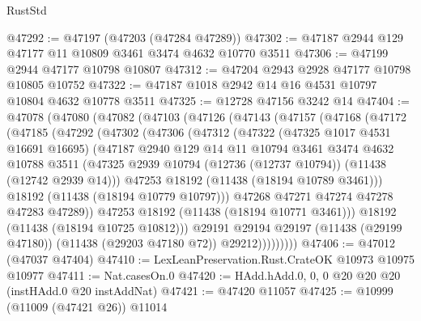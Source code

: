 \begin{lexlean}{RustStd}
\begin{coremodule}
@47292 := @47197 (@47203 (@47284 @47289))
@47302 := @47187 @2944 @129 @47177 @11 @10809 @3461 @3474 @4632 @10770 @3511
@47306 := @47199 @2944 @47177 @10798 @10807
@47312 := @47204 @2943 @2928 @47177 @10798 @10805 @10752
@47322 := @47187 @1018 @2942 @14 @16 @4531 @10797 @10804 @4632 @10778 @3511
@47325 := @12728 @47156 @3242 @14
@47404 := @47078
    (@47080
      (@47082
        (@47103
          (@47126
            (@47143
              (@47157
                (@47168
                  (@47172
                    (@47185
                      (@47292
                        (@47302
                          (@47306
                            (@47312
                              (@47322
                                (@47325 @1017 @4531 @16691 @16695)
                                (@47187
                                  @2940
                                  @129
                                  @14
                                  @11
                                  @10794
                                  @3461
                                  @3474
                                  @4632
                                  @10788
                                  @3511
                                  (@47325
                                    @2939
                                    @10794
                                    (@12736 (@12737 @10794))
                                    (@11438 (@12742 @2939 @14)))
                                  @47253
                                  @18192
                                  (@11438 (@18194 @10789 @3461)))
                                @18192
                                (@11438 (@18194 @10779 @10797)))
                              @47268
                              @47271
                              @47274
                              @47278
                              @47283
                              @47289))
                          @47253
                          @18192
                          (@11438 (@18194 @10771 @3461)))
                        @18192
                        (@11438 (@18194 @10725 @10812)))
                      @29191
                      @29194
                      @29197
                      (@11438 (@29199 @47180))
                      (@11438 (@29203 @47180 @72))
                      @29212)))))))))
@47406 := @47012 (@47037 @47404)
@47410 := LexLeanPreservation.Rust.CrateOK @10973 @10975 @10977
@47411 := Nat.casesOn.{0}
@47420 := HAdd.hAdd.{0, 0, 0} @20 @20 @20 (instHAdd.{0} @20 instAddNat)
@47421 := @47420 @11057
@47425 := @10999 (@11009 (@47421 @26)) @11014

\end{coremodule}
\end{lexlean}
